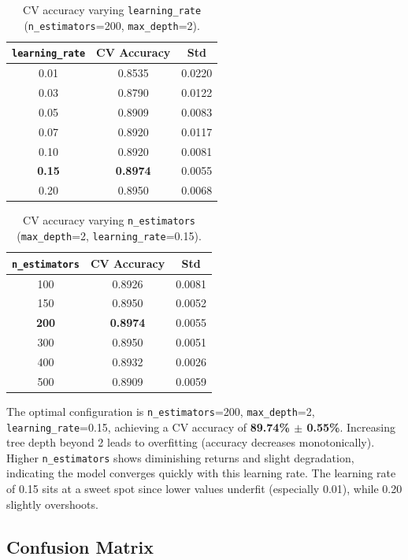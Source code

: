 \documentclass[12pt]{article}
\begin{document}
\begin{table}[H]
\centering
\caption{CV accuracy varying \texttt{learning\_rate} (\texttt{n\_estimators}=200, \texttt{max\_depth}=2).}
\label{tab:lr}
\begin{tabular}{ccc}
\toprule
\texttt{learning\_rate} & CV Accuracy & Std \\
\midrule
0.01 & 0.8535 & 0.0220 \\
0.03 & 0.8790 & 0.0122 \\
0.05 & 0.8909 & 0.0083 \\
0.07 & 0.8920 & 0.0117 \\
0.10 & 0.8920 & 0.0081 \\
\textbf{0.15} & \textbf{0.8974} & 0.0055 \\
0.20 & 0.8950 & 0.0068 \\
\bottomrule
\end{tabular}
\end{table}

\begin{table}[H]
\centering
\caption{CV accuracy varying \texttt{n\_estimators} (\texttt{max\_depth}=2, \texttt{learning\_rate}=0.15).}
\label{tab:nest}
\begin{tabular}{ccc}
\toprule
\texttt{n\_estimators} & CV Accuracy & Std \\
\midrule
100 & 0.8926 & 0.0081 \\
150 & 0.8950 & 0.0052 \\
\textbf{200} & \textbf{0.8974} & 0.0055 \\
300 & 0.8950 & 0.0051 \\
400 & 0.8932 & 0.0026 \\
500 & 0.8909 & 0.0059 \\
\bottomrule
\end{tabular}
\end{table}

The optimal configuration is \texttt{n\_estimators}=200, \texttt{max\_depth}=2, \texttt{learning\_rate}=0.15, achieving a CV accuracy of \textbf{89.74\% $\pm$ 0.55\%}. Increasing tree depth beyond 2 leads to overfitting (accuracy decreases monotonically). Higher \texttt{n\_estimators} shows diminishing returns and slight degradation, indicating the model converges quickly with this learning rate. The learning rate of 0.15 sits at a sweet spot since lower values underfit (especially 0.01), while 0.20 slightly overshoots.

\subsection*{Confusion Matrix}
\end{document}
